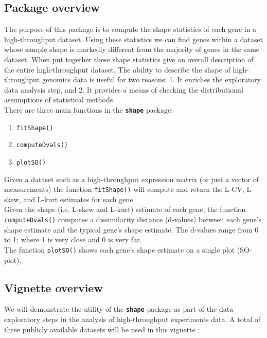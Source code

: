 \documentclass[a4paper, 10pt]{article}\usepackage[]{graphicx}\usepackage[]{color}
\begin{document}
\subsection{Package overview}

The purpose of this package is to compute
the shape statistics of each gene in a high-throughput dataset.
Using these statistics we can find
genes within a dataset
whose sample shape is markedly different from 
the majority of genes in the same dataset. 
When put together these shape statistics give an overall
description of the entire high-throughput dataset.
The ability to describe the shape of high-throughput
genomics data is useful for two reasons: 
1. It enriches the exploratory data analysis step, and
2. It provides a means of checking the distributional 
assumptions of statistical methods.\\

\noindent There are three main functions in the \textbf{\texttt{shape}} 
package:
\begin{enumerate}
\item \texttt{fitShape()}
\item \texttt{computeDvals()}
\item \texttt{plotSO()}
\end{enumerate}

\noindent Given a dataset such as a high-throughput expression matrix 
(or just a vector of measurements) the function \texttt{fitShape()}
will compute and return the L-CV, L-skew, and L-kurt estimates 
for each gene.\\

\noindent Given the shape (i.e. L-skew and L-kurt) estimate
of each gene, the function 
\texttt{computeDvals()} computes a dissimilarity 
distance (d-values) between each gene's shape estimate
and the typical gene's shape estimate. 
The d-values range from 0 to 1; where 1 is very close and 
0 is very far.\\  

\noindent The function \texttt{plotSO()} shows 
each gene's shape estimate on a single plot (SO-plot). 

\subsection{Vignette overview}

We will demonstrate the utility of the \textbf{\texttt{shape}}
package as part of the data exploratory steps in the analysis of 
high-throughput experiments data. 
A total of three publicly available datasets will
be used in this vignette :
\end{document}
